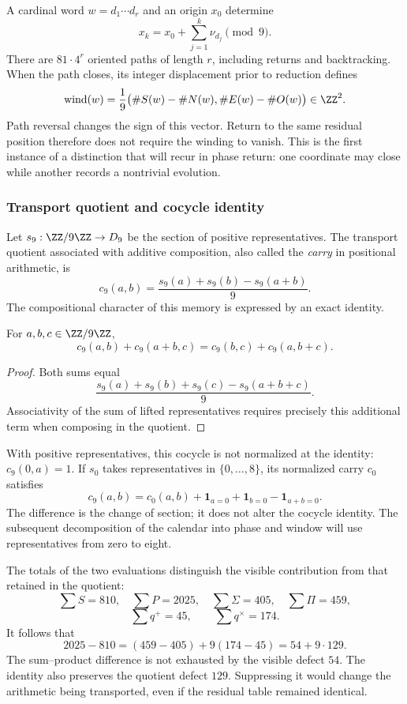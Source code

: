 A cardinal word \(w=d_1\cdots d_r\) and an origin \(x_0\) determine
\[
 x_k=x_0+\sum_{j=1}^k\nu_{d_j}\pmod9.
\]
There are \(81\cdot4^r\) oriented paths of length \(r\), including returns and backtracking. When the path closes, its integer displacement prior to reduction defines
\begin{equation}
 \operatorname{wind}(w)=\frac19
 \bigl(\#S(w)-\#N(w),\#E(w)-\#O(w)\bigr)\in\ZZ^2.
\end{equation}
Path reversal changes the sign of this vector. Return to the same residual position therefore does not require the winding to vanish. This is the first instance of a distinction that will recur in phase return: one coordinate may close while another records a nontrivial evolution.

\subsubsection{Transport quotient and cocycle identity}

Let \(s_9:\ZZ/9\ZZ\to D_9\) be the section of positive representatives. The transport quotient associated with additive composition, also called the \emph{carry} in positional arithmetic, is
\[
 c_9(a,b)=\frac{s_9(a)+s_9(b)-s_9(a+b)}9.
\]
The compositional character of this memory is expressed by an exact identity.

\begin{lemma}
For \(a,b,c\in\ZZ/9\ZZ\),
\[
 c_9(a,b)+c_9(a+b,c)=c_9(b,c)+c_9(a,b+c).
\]
\end{lemma}
\begin{proof}
Both sums equal
\[
 \frac{s_9(a)+s_9(b)+s_9(c)-s_9(a+b+c)}9.
\]
Associativity of the sum of lifted representatives requires precisely this additional term when composing in the quotient.
\end{proof}

With positive representatives, this cocycle is not normalized at the identity: \(c_9(0,a)=1\). If \(s_0\) takes representatives in \(\{0,\ldots,8\}\), its normalized carry \(c_0\) satisfies
\[
 c_9(a,b)=c_0(a,b)+\mathbf1_{a=0}+\mathbf1_{b=0}-\mathbf1_{a+b=0}.
\]
The difference is the change of section; it does not alter the cocycle identity. The subsequent decomposition of the calendar into phase and window will use representatives from zero to eight.

The totals of the two evaluations distinguish the visible contribution from that retained in the quotient:
\[
 \sum S=810,\quad\sum P=2025,\quad
 \sum\Sigma=405,\quad\sum\Pi=459,
\]
\[
 \sum q^+=45,\qquad\sum q^\times=174.
\]
It follows that
\begin{equation}
 2025-810=(459-405)+9(174-45)=54+9\cdot129.
 \label{eq:defecto-integrado}
\end{equation}
The sum--product difference is not exhausted by the visible defect \(54\). The identity also preserves the quotient defect \(129\). Suppressing it would change the arithmetic being transported, even if the residual table remained identical.

